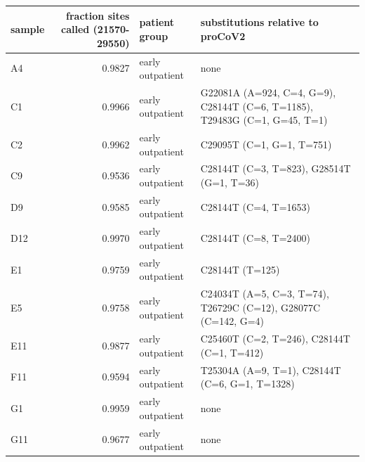 \documentclass[9pt,twocolumn,twoside]{gsajnl_modified}
\begin{document}
\begin{table}[]
{\small
\begin{tabular}{lrll}
\toprule
sample &  fraction sites called (21570-29550) &           patient group &                                        substitutions relative to proCoV2 \\
\midrule
A4 &                               0.9827 &        early outpatient &                                                                          none \\
C1 &                               0.9966 &        early outpatient &  G22081A (A=924, C=4, G=9), C28144T (C=6, T=1185), T29483G (C=1, G=45, T=1) \\
C2 &                               0.9962 &        early outpatient &                                                 C29095T (C=1, G=1, T=751)  \\
C9 &                               0.9536 &        early outpatient &                                  C28144T (C=3, T=823), G28514T (G=1, T=36)  \\
D9 &                               0.9585 &        early outpatient &                                                     C28144T (C=4, T=1653)  \\
D12 &                               0.9970 &        early outpatient &                                                     C28144T (C=8, T=2400)  \\
E1 &                               0.9759 &        early outpatient &                                                           C28144T (T=125)  \\
E5 &                               0.9758 &        early outpatient &              C24034T (A=5, C=3, T=74), T26729C (C=12), G28077C (C=142, G=4)  \\
E11 &                               0.9877 &        early outpatient &                                 C25460T (C=2, T=246), C28144T (C=1, T=412)  \\
F11 &                               0.9594 &        early outpatient &                             T25304A (A=9, T=1), C28144T (C=6, G=1, T=1328)  \\
G1 &                               0.9959 &        early outpatient &                                   none                                        \\
G11 &                               0.9677 &        early outpatient &                                  none                                         \\

\end{tabular}}
\end{table}
\end{document}
